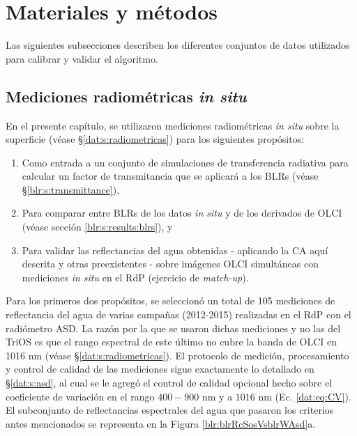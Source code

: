 \section{Materiales y métodos}
\label{blr:s:materials}

    Las siguientes subsecciones describen los diferentes conjuntos de datos utilizados para calibrar y validar el algoritmo.

    \subsection{Mediciones radiométricas \textit{in situ}}
    \label{blr:s:insitu}
    
        En el presente capítulo, se utilizaron mediciones radiométricas \textit{in situ} sobre la superficie (véase \S \ref{dat:s:radiometricas}) para los siguientes propósitos:
        
        \begin{enumerate}
            \item Como entrada a un conjunto de simulaciones de transferencia radiativa para calcular un factor de transmitancia que se aplicará a los BLRs (véase \S \ref{blr:s:transmittance}),
            \item Para comparar entre BLRs de los datos \textit{in situ} y de los derivados de OLCI (véase sección \ref{blr:s:results:blrs}), y
            \item Para validar las reflectancias del agua obtenidas - aplicando la CA aquí descrita y otras preexistentes - sobre imágenes OLCI simultáneas con mediciones \textit{in situ} en el RdP (ejercicio de \textit{match-up}).
        \end{enumerate}
        
        Para los primeros dos propósitos, se seleccionó un total de 105 mediciones de reflectancia del agua de varias campañas (2012-2015) realizadas en el RdP con el radiómetro ASD. La razón por la que se usaron dichas mediciones y no las del TriOS es que el rango espectral de este último no cubre la banda de OLCI en 1016 nm (véase \S \ref{dat:s:radiometricas}). El protocolo de medición, procesamiento y control de calidad de las mediciones sigue exactamente lo detallado en \S \ref{dat:s:asd}, al cual se le agregó el control de calidad opcional hecho sobre el coeficiente de variación en el rango $400-900$ nm y a $1016$ nm (Ec. \ref{dat:eq:CV}). El subconjunto de reflectancias espectrales del agua que pasaron los criterios antes mencionados se representa en la Figura \ref{blr:blrRcSosVsblrWAsd}a.

